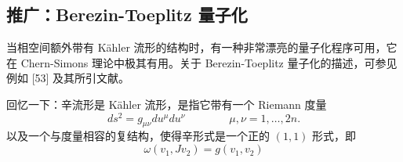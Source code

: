 
\subsection{推广：Berezin-Toeplitz 量子化} %


当相空间额外带有 Kähler 流形的结构时，有一种非常漂亮的量子化程序可用，它在 Chern-Simons 理论中极其有用。关于 Berezin-Toeplitz 量子化的描述，可参见例如 [53] 及其所引文献。

回忆一下：辛流形是 Kähler 流形，是指它带有一个 Riemann 度量
\begin{equation}
  ds^2=g_{\mu\nu}du^\mu du^\nu\qquad\qquad \mu,\nu=1,\dots,2n.
  \tag{B.7}
  \label{eq:B.7}
\end{equation}
以及一个与度量相容的复结构，使得辛形式是一个正的 $(1,1)$ 形式，即
\begin{equation}
  \omega(v_1,Jv_2)=g(v_1,v_2)
  \tag{B.8}
  \label{eq:B.8}
\end{equation}

